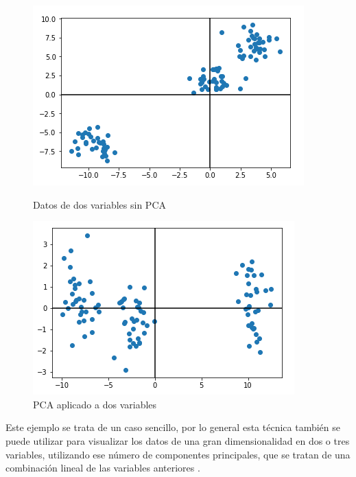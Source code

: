 \begin{figure}[H]
   \begin{minipage}{0.48\textwidth}
     \centering
     \includegraphics[width=1\linewidth]{figs/PCA_previo.PNG}
     \caption{Datos de dos variables sin PCA}
     \label{Fig:PCA1}
   \end{minipage}\hfill
   \begin{minipage}{0.48\textwidth}
     \centering
     \includegraphics[width=0.95\linewidth]{figs/PCA_aplicado.PNG}
     \caption{PCA aplicado a dos variables}
     \label{Fig:PCA2}
   \end{minipage}
\end{figure}

Este ejemplo se trata de un caso sencillo, por lo general esta técnica también se puede utilizar para visualizar los datos de una gran dimensionalidad en dos o tres variables, utilizando ese número de componentes principales, que se tratan de una combinación lineal de las variables anteriores \cite{james2013introduction}.

